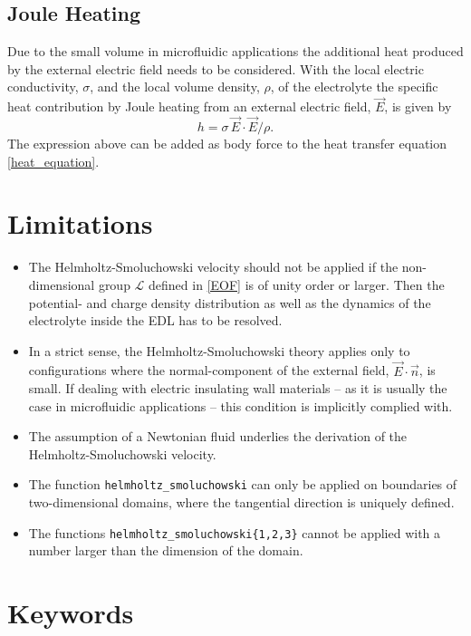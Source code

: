 \subsection{Joule Heating}
Due to the small volume in microfluidic applications the additional heat produced by the external electric field needs to be considered. With the local electric conductivity, $\sigma$, and the local volume density, $\rho$, of the electrolyte the specific heat contribution by Joule heating from an external electric field, $\vec{E}$, is given by
\begin{equation}
\label{ek:joule-heating}
h = \sigma\,\vec{E}\cdot\vec{E}/\rho.
\end{equation}
The expression above can be added as body force to the heat transfer equation \eqref{heat_equation}.

\section{Limitations}
\begin{itemize}
\item The Helmholtz-Smoluchowski velocity should not be applied if the non-di\-men\-sion\-al group $\mathcal{L}$ defined in \ref{EOF} is of unity order or larger. Then the potential- and charge density distribution as well as the dynamics of the electrolyte inside the EDL has to be resolved. 
\item In a strict sense, the Helmholtz-Smoluchowski theory applies only to configurations where the normal-component of the external field, $\vec{E}\cdot\vec{n}$, is small. If dealing with electric insulating wall materials -- as it is usually the case in microfluidic applications -- this condition is implicitly complied with. 
\item The assumption of a Newtonian fluid underlies the derivation of the Helmholtz-Smoluchowski velocity.
\item The function \texttt{helmholtz\_smoluchowski} can only be applied on  boundaries of two-dimensional domains, where the tangential direction is uniquely defined.
\item The functions \texttt{helmholtz\_smoluchowski\{1,2,3\}} cannot be applied with a number larger than the dimension of the domain.
\end{itemize}


\section{Keywords}

